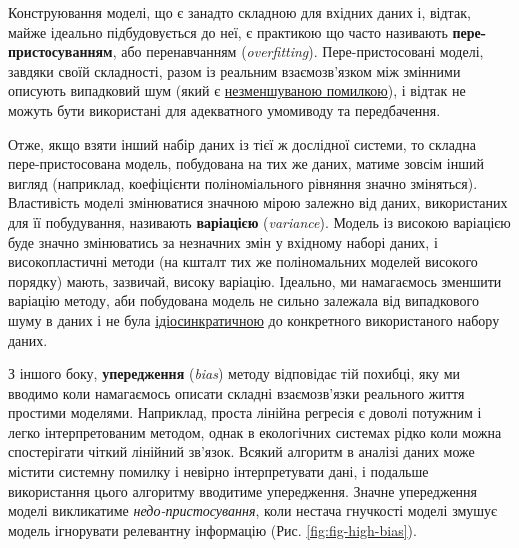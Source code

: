\documentclass[
  11pt,
]{book}
\begin{document}
Конструювання моделі, що є занадто складною для вхідних даних і, відтак, майже ідеально підбудовується до неї, є практикою що часто називають \textbf{пере-пристосуванням}, або перенавчанням (\emph{overfitting}). Пере-пристосовані моделі, завдяки своїй складності, разом із реальним взаємозв'язком між змінними описують випадковий шум (який є \hyperref[inference]{незменшуваною помилкою}), і відтак не можуть бути використані для адекватного умомиводу та передбачення.

Отже, якщо взяти інший набір даних із тієї ж дослідної системи, то складна пере-пристосована модель, побудована на тих же даних, матиме зовсім інший вигляд (наприклад, коефіцієнти поліноміального рівняння значно зміняться). Властивість моделі змінюватися значною мірою залежно від даних, використаних для її побудування, називають \textbf{варіацією} (\emph{variance}). Модель із високою варіацією буде значно змінюватись за незначних змін у вхідному наборі даних, і високопластичні методи (на кшталт тих же поліномальних моделей високого порядку) мають, зазвичай, високу варіацію. Ідеально, ми намагаємось зменшити варіацію методу, аби побудована модель не сильно залежала від випадкового шуму в даних і не була \href{https://en.wikipedia.org/wiki/Idiosyncrasy}{ідіосинкратичною} до конкретного використаного набору даних.

З іншого боку, \textbf{упередження} (\emph{bias}) методу відповідає тій похибці, яку ми вводимо коли намагаємось описати складні взаємозв'язки реального життя простими моделями. Наприклад, проста лінійна регресія є доволі потужним і легко інтерпретованим методом, однак в екологічних системах рідко коли можна спостерігати чіткий лінійний зв'язок. Всякий алгоритм в аналізі даних може містити системну помилку і невірно інтерпретувати дані, і подальше використання цього алгоритму вводитиме упередження. Значне упередження моделі викликатиме \emph{недо-пристосування}, коли нестача гнучкості моделі змушує модель ігнорувати релевантну інформацію (Рис. \ref{fig:fig-high-bias}).
\end{document}
